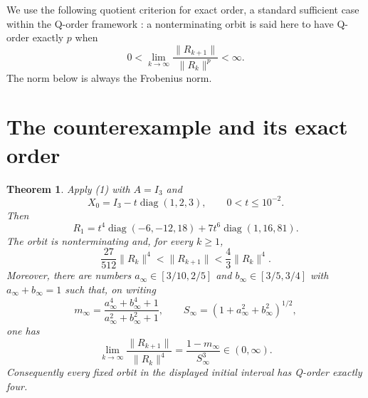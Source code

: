 \documentclass[11pt]{article}
\newtheorem{theorem}{Theorem}
\newcommand{\norm}[1]{\lVert #1\rVert}
\DeclareMathOperator{\diag}{diag}
\begin{document}
We use the following quotient criterion for exact order, a standard sufficient
case within the Q-order framework \cite{Jay2001}: a nonterminating orbit is
said here to have Q-order exactly $p$ when
\[
 0<\lim_{k\to\infty}
 \frac{\norm{R_{k+1}}}{\norm{R_k}^{p}}<\infty.
\]
The norm below is always the Frobenius norm.

\section{The counterexample and its exact order}

\begin{theorem}\label{thm:main}
Apply \emph{(1)} with $A=I_3$ and
\[
 X_0=I_3-t\diag(1,2,3),\qquad 0<t\leq10^{-2}.
\]
Then
\begin{equation}
 R_1=t^4\diag(-6,-12,18)+7t^6\diag(1,16,81).
\end{equation}
The orbit is nonterminating and, for every $k\geq1$,
\begin{equation}
 \frac{27}{512}\norm{R_k}^{4}
 <\norm{R_{k+1}}<\frac43\norm{R_k}^{4}.
\end{equation}
Moreover, there are numbers
$a_\infty\in[3/10,2/5]$ and
$b_\infty\in[3/5,3/4]$ with
$a_\infty+b_\infty=1$ such that, on writing
\[
 m_\infty=\frac{a_\infty^4+b_\infty^4+1}
                  {a_\infty^2+b_\infty^2+1},\qquad
 S_\infty=(1+a_\infty^2+b_\infty^2)^{1/2},
\]
one has
\begin{equation}
 \lim_{k\to\infty}\frac{\norm{R_{k+1}}}{\norm{R_k}^{4}}
 =\frac{1-m_\infty}{S_\infty^3}\in(0,\infty).
\end{equation}
Consequently every fixed orbit in the displayed initial interval has Q-order
exactly four.
\end{theorem}
\end{document}
